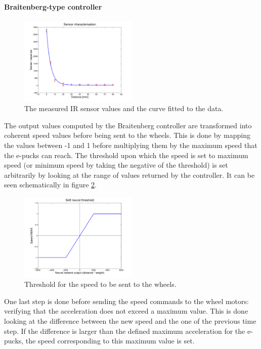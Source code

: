 \documentclass[a4paper, 10pt, conference]{ieeeconf}      %
\begin{document}
\paragraph{Braitenberg-type controller}

\begin{figure}[thpb]
      \centering
      \includegraphics[width = 0.5\textwidth]{images/sensor.pdf}
      \caption{The measured IR sensor values and the curve fitted to the data.}
      \label{fig:regression}
\end{figure}

The output values computed by the Braitenberg controller are transformed into coherent speed values before being sent to the wheels. This is done by mapping the values between -1 and 1 before multiplying them by the maximum speed that the e-pucks can reach. The threshold upon which the speed is set to maximum speed (or minimum speed by taking the negative of the threshold) is set arbitrarily by looking at the range of values returned by the controller. It can be seen schematically in figure \ref{fig:threshold}.

\begin{figure}[thpb]
      \centering
      \includegraphics[width = 0.5\textwidth]{images/threshold.pdf}
      \caption{Threshold for the speed to be sent to the wheels.}
      \label{fig:threshold}
\end{figure}

One last step is done before sending the speed commands to the wheel motors: verifying that the acceleration does not exceed a maximum value. This is done looking at the difference between the new speed and the one of the previous time step. If the difference is larger than the defined maximum acceleration for the e-pucks, the speed corresponding to this maximum value is set.
\end{document}
